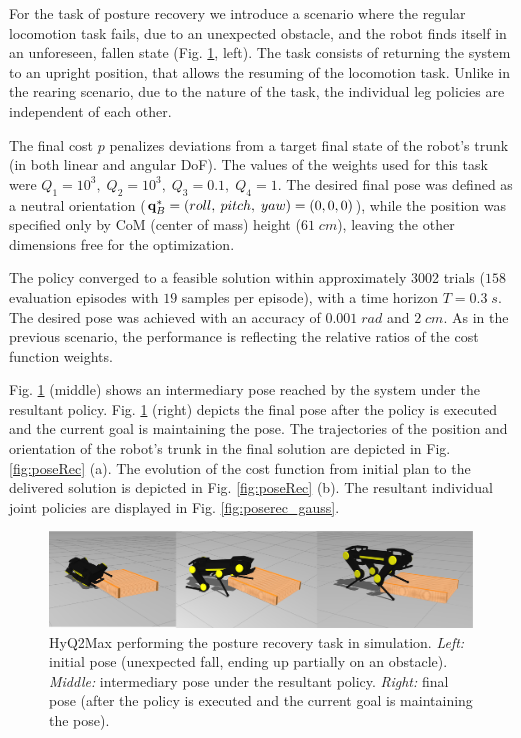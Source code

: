 \documentclass[usletter, 10pt, conference]{ieeeconf}      %
\begin{document}
For the task of posture recovery we introduce a scenario where the regular 
locomotion task fails, due to an unexpected obstacle, and the robot finds itself in an unforeseen,
fallen state (Fig. \ref{fig:sr_behaviour}, left). The task consists of returning the system to
an upright position, that allows the resuming of the locomotion task. Unlike in the rearing scenario, due to 
the nature of the task, the individual leg policies are independent of each other.

The final cost $p$ penalizes deviations from a target final state of the robot's 
trunk (in both linear and angular DoF). The values of the weights used for this task were 
$Q_{1} = 10^3, \; Q_{2} = 10^3, \; Q_{3} = 0.1, \; Q_{4} = 1$.
The desired final pose was defined as a neutral orientation ($\mathbf{q}^{*}_{B} = (roll, \: pitch, \; yaw) = (0, 0, 0)$),
while the position was specified only by CoM (center of mass) height ($61\; cm$), leaving the other dimensions free for the optimization. 

The policy converged to a feasible solution within approximately 3002 trials 
($158$ evaluation episodes with $19$ samples per episode), 
with a time horizon $T=0.3\;s$. The desired pose was achieved with an accuracy 
of $0.001\; rad$  and $2 \; cm$. As in the previous scenario, the performance is
reflecting the relative ratios of the cost function weights.

Fig. \ref{fig:sr_behaviour} (middle) shows an intermediary pose reached 
by the system under the resultant policy. Fig. \ref{fig:sr_behaviour} 
(right) depicts the final pose after the policy is executed and the current 
goal is maintaining the pose. 
The trajectories of the position and orientation of the robot's trunk in the final
solution are depicted in Fig. \ref{fig:poseRec} (a).
The evolution of the cost function from initial plan to the delivered solution 
is depicted in Fig. \ref{fig:poseRec} (b). 
The resultant individual joint policies are displayed in Fig. \ref{fig:poserec_gauss}.

\begin{figure}[t!]
 \centering
  \vspace*{+4mm}
 \includegraphics[scale=.2]{sr_befor_after_new.eps} 
 \caption{HyQ2Max performing the posture recovery task in simulation. 
\textit{Left:} initial pose (unexpected fall, ending up partially on an obstacle). 
\textit{Middle:} intermediary pose under the resultant policy.
 \textit{Right:} final pose (after the policy is executed and the current 
goal is maintaining the pose).}
   \vspace*{-4mm}
  \label{fig:sr_behaviour}
\end{figure}
\end{document}
